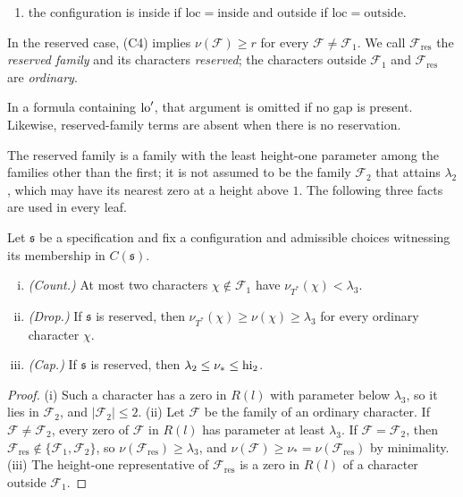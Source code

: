 \begin{definition}[Specification]
\begin{enumerate}[(C1)]
    $\nu(\mathcal F_{\mathrm{res}})=\nu_*$ has exactly $n_2$ characters (so it is a real character if $n_2=1$ and
    a pair of conjugate nonreal characters if $n_2=2$);
  \item the configuration is inside if $\mathrm{loc}=\mathrm{inside}$ and outside if $\mathrm{loc}=\mathrm{outside}$.
\end{enumerate}
In the reserved case, (C4) implies $\nu(\mathcal F)\ge r$ for every $\mathcal F\ne\mathcal F_1$. We call $\mathcal F_{\mathrm{res}}$ the
\emph{reserved family} and its characters \emph{reserved}; the characters outside $\mathcal F_1$ and
$\mathcal F_{\mathrm{res}}$ are \emph{ordinary}.
\end{definition}

In a formula containing $\mathrm{lo}'$, that argument is omitted if no gap is present.
Likewise, reserved-family terms are absent when there is no reservation.

The reserved family is a family with the least height-one parameter among the families other than
the first; it is not assumed to be the family $\mathcal F_2$ that attains $\lambda_2$, which may have its
nearest zero at a height above $1$. The following three facts are used in every leaf.

\begin{lemma}\label{lem:familyfacts}
Let $\mathfrak s$ be a specification and fix a configuration and admissible choices
witnessing its membership in $C(\mathfrak s)$.
\begin{enumerate}[(i)]
  \item \emph{(Count.)} At most two characters $\chi\notin \mathcal F_1$ have $\nu_{T^*}(\chi)<\lambda_3$.
  \item \emph{(Drop.)} If $\mathfrak s$ is reserved, then $\nu_{T^*}(\chi)\ge\nu(\chi)\ge\lambda_3$ for every
    ordinary character $\chi$.
  \item \emph{(Cap.)} If $\mathfrak s$ is reserved, then $\lambda_2\le\nu_*\le\mathrm{hi}_2$.
\end{enumerate}
\end{lemma}

\begin{proof}
(i) Such a character has a zero in $R(l)$ with parameter below $\lambda_3$, so it lies in $\mathcal F_2$, and
$|\mathcal F_2|\le2$. (ii) Let $\mathcal F$ be the family of an ordinary character. If $\mathcal F\ne\mathcal F_2$, every zero of $\mathcal F$
in $R(l)$ has parameter at least $\lambda_3$. If $\mathcal F=\mathcal F_2$, then $\mathcal F_{\mathrm{res}}\notin\{\mathcal F_1,\mathcal F_2\}$, so
$\nu(\mathcal F_{\mathrm{res}})\ge\lambda_3$, and $\nu(\mathcal F)\ge\nu_*=\nu(\mathcal F_{\mathrm{res}})$ by minimality. (iii) The
height-one representative of $\mathcal F_{\mathrm{res}}$ is a zero in $R(l)$ of a character outside $\mathcal F_1$.
\end{proof}

